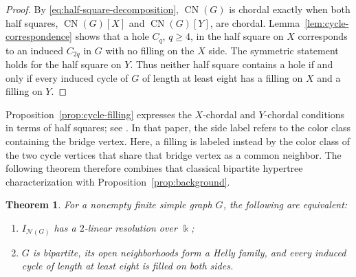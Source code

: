 \documentclass[10pt,a4paper]{amsart}
\newtheorem{theorem}{Theorem}[section]
\numberwithin{equation}{section}
\newcommand{\NN}{\mathcal N}
\newcommand{\CN}{\operatorname{CN}}
\begin{document}
	\begin{proof}
		By \eqref{eq:half-square-decomposition}, \(\CN(G)\) is chordal exactly when
		both half squares, \(\CN(G)[X]\) and \(\CN(G)[Y]\), are chordal.
		Lemma~\ref{lem:cycle-correspondence} shows that a hole \(C_q\), \(q\ge4\),
		in the half square on \(X\) corresponds to an induced \(C_{2q}\) in \(G\) with
		no filling on the \(X\) side. The symmetric statement holds for the half
		square on \(Y\). Thus neither half square contains a hole if and only if every
		induced cycle of
		\(G\) of length at least eight has a filling on \(X\) and a filling on
		\(Y\).
	\end{proof}
	
	Proposition~\ref{prop:cycle-filling} expresses the \(X\)-chordal and
	\(Y\)-chordal conditions in terms of half squares; see
	\cite[Theorems~6--7]{BrandstadtDraganChepoiVoloshin1998}. In that paper,
	the side label refers to the color class containing the bridge
	vertex. Here,
	a filling is labeled instead by the color class of the two cycle vertices that
	share that bridge vertex as a common neighbor. The following theorem therefore
	combines that classical bipartite hypertree characterization with
	Proposition~\ref{prop:background}.
	
	\begin{theorem}\label{thm:structural}
		For a nonempty finite simple graph \(G\), the following are equivalent:
		\begin{enumerate}[label=\textup{(\roman*)}]
			\item \(I_{\NN(G)}\) has a \(2\)-linear resolution over \(\Bbbk\);
			\item \(G\) is bipartite, its open neighborhoods form a Helly family, and
			every induced cycle of length at least eight is filled on both sides.
		\end{enumerate}
	\end{theorem}
	
\end{document}
